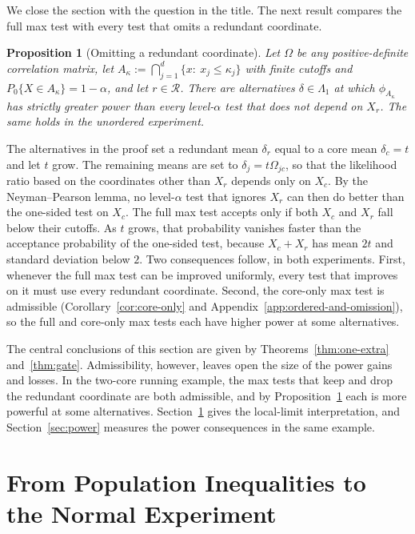 \documentclass[11pt]{article}
\newcommand{\red}[1]{{\color{red}#1}} %
\numberwithin{equation}{section}
\newtheorem{proposition}{Proposition}
\theoremstyle{definition}
\begin{document}
\red{%
We close the section with the question in the title. The next result compares the full max test with every test that omits a redundant coordinate.

\begin{proposition}[Omitting a redundant coordinate]\label{prop:omit}
Let $\Omega$ be any positive-definite correlation matrix, let $A_\kappa:=\bigcap_{j=1}^d\{x:\ x_j\le\kappa_j\}$ with finite cutoffs and $P_0\{X\in A_\kappa\}=1-\alpha$, and let $r\in\mathcal R$. There are alternatives $\delta\in\Lambda_1$ at which $\phi_{A_\kappa}$ has strictly greater power than every level-$\alpha$ test that does not depend on $X_r$. The same holds in the unordered experiment.
\end{proposition}

The alternatives in the proof set a redundant mean $\delta_r$ equal to a core mean $\delta_c=t$ and let $t$ grow. The remaining means are set to $\delta_j=t\Omega_{jc}$, so that the likelihood ratio based on the coordinates other than $X_r$ depends only on $X_c$. By the Neyman--Pearson lemma, no level-$\alpha$ test that ignores $X_r$ can then do better than the one-sided test on $X_c$. The full max test accepts only if both $X_c$ and $X_r$ fall below their cutoffs. As $t$ grows, that probability vanishes faster than the acceptance probability of the one-sided test, because $X_c+X_r$ has mean $2t$ and standard deviation below $2$. Two consequences follow, in both experiments. First, whenever the full max test can be improved uniformly, every test that improves on it must use every redundant coordinate. Second, the core-only max test is admissible (Corollary~\ref{cor:core-only} and Appendix~\ref{app:ordered-and-omission}), so the full and core-only max tests each have higher power at some alternatives.
}


The central conclusions of this section are given by Theorems~\ref{thm:one-extra} and~\ref{thm:gate}. Admissibility, however, leaves open the size of the power gains and losses. In the two-core running example, the max tests that keep and drop the redundant coordinate are both admissible, and \red{by Proposition~\ref{prop:omit}} each is more powerful at some alternatives. Section~\ref{sec:population} gives the local-limit interpretation, and Section~\ref{sec:power} measures the power consequences in the same example.


\section{From Population Inequalities to the Normal Experiment}\label{sec:population}
\end{document}
